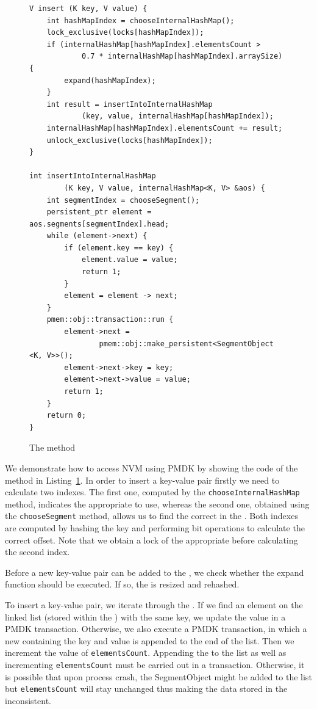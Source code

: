 \begin{figure}[ht]
\renewcommand{\figurename}{Listing}
\begin{lstlisting}
V insert (K key, V value) {
    int hashMapIndex = chooseInternalHashMap();
    lock_exclusive(locks[hashMapIndex]);
    if (internalHashMap[hashMapIndex].elementsCount > 
            0.7 * internalHashMap[hashMapIndex].arraySize) {
        expand(hashMapIndex);
    }
    int result = insertIntoInternalHashMap
            (key, value, internalHashMap[hashMapIndex]);
    internalHashMap[hashMapIndex].elementsCount += result;
    unlock_exclusive(locks[hashMapIndex]);
}
    
int insertIntoInternalHashMap
        (K key, V value, internalHashMap<K, V> &aos) {
    int segmentIndex = chooseSegment();
    persistent_ptr element = aos.segments[segmentIndex].head;
    while (element->next) {
        if (element.key == key) {
            element.value = value;
            return 1;
        } 
        element = element -> next;
    }
    pmem::obj::transaction::run {
        element->next = 
                pmem::obj::make_persistent<SegmentObject <K, V>>();
        element->next->key = key;
        element->next->value = value;
        return 1;
    }
    return 0;
}
\end{lstlisting}
\renewcommand{\figurename}{Listing}
\caption{The \insertMethod method}
\label{insertMethod}
\end{figure}
    
    We demonstrate how to access NVM using PMDK by showing the code of the \insertMethod method in Listing~\ref{insertMethod}. In order to insert a  key-value pair firstly we need to calculate two indexes. The first one, computed by the \texttt{choose\-Internal\-HashMap} method, indicates the appropriate \internalHashMap to use, whereas the second one, obtained using the \texttt{choose\-Segment} method, allows us to find the correct \Segment in the \internalHashMap. Both indexes are computed by hashing the key and performing bit operations to calculate the correct offset. Note that we obtain a lock of the appropriate \internalHashMap before calculating the second index. 
    
    Before a new key-value pair can be added to the \Segment, we check whether the expand function should be executed. If so, the \internalHashMap is resized and rehashed. 
    
    To insert a key-value pair, we iterate through the \Segment. If we find an element on the linked list (stored within the \Segment) with the same key, we update the value in a PMDK transaction. Otherwise, we also execute a PMDK transaction, in which a new \SegmentObject containing the key and value is appended to the end of the list. Then we increment the value of \texttt{elementsCount}. Appending the \SegmentObject to the list as well as incrementing \texttt{elementsCount} must be carried out in a transaction. Otherwise, it is possible that upon process crash, the SegmentObject might be added to the list but \texttt{elementsCount} will stay unchanged thus making the data stored in the \internalHashMap inconsistent.
        
